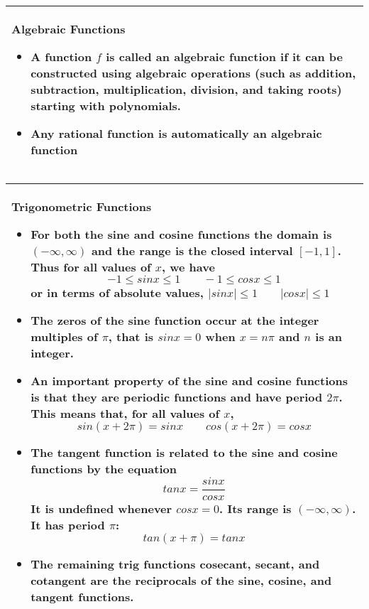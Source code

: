 \documentclass[fleqn]{article}
\begin{document}
\begin{center}
\def\arraystretch{1.3}
{\setlength{\tabcolsep}{16pt}
\begin{tabularx}{.9\textwidth}{|X|}
\hline
	\vspace{1pt}
	\textbf{Algebraic Functions}
	\begin{itemize}
	\item A function $f$ is called an \textbf{algebraic function} if it can be constructed using algebraic operations (such as addition, subtraction, multiplication, division, and taking roots) starting with polynomials.
	\item Any rational function is automatically an algebraic function
	\end{itemize} \\
\hline
\end{tabularx}}
\vspace{12pt}	

\def\arraystretch{1.3}
{\setlength{\tabcolsep}{16pt}
\begin{tabularx}{.9\textwidth}{|X|}
\hline
	\vspace{1pt}
	\textbf{Trigonometric Functions}
	\begin{itemize}
	\item For both the sine and cosine functions the domain is $(-\infty, \infty)$ and the range is the closed interval $[-1, 1]$. Thus for all values of $x$, we have
	$$-1 \le sinx \le 1 \hspace{24pt} -1 \le cosx \le 1$$
	or in terms of absolute values, \hspace{12pt} $|sinx| \le 1 \hspace{24pt} |cosx| \le 1$
	\item The zeros of the sine function occur at the integer multiples of $\pi$, that is $sinx = 0$ when $x=n\pi$ and $n$ is an integer.
	\item An important property of the sine and cosine functions is that they are periodic functions and have period $2\pi$. This means that, for all values of $x$,
	$$sin(x+2\pi) = sinx \hspace{24pt} cos(x+2\pi) = cosx$$
	\item The tangent function is related to the sine and cosine functions by the equation
	$$tanx = \dfrac{sinx}{cosx}$$
	It is undefined whenever $cosx = 0$. Its range is $(-\infty, \infty)$. It has period $\pi$:
	$$tan(x+\pi) = tanx$$
	\item The remaining trig functions cosecant, secant, and cotangent are the reciprocals of the sine, cosine, and tangent functions.
	\end{itemize} \\
\hline
\end{tabularx}}
\vspace{12pt}	


\end{center}
\end{document}
